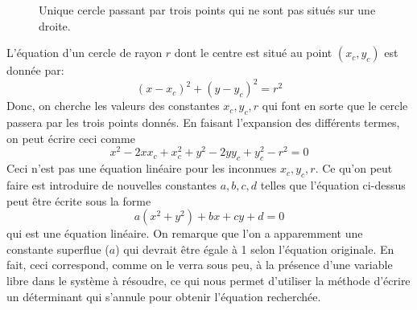 \begin{figure}[h]
\begin{center}
\caption{Unique cercle passant par trois points qui ne sont pas situés sur une droite.}
\end{center}
\end{figure}

L'équation d'un cercle de rayon $r$ dont le centre est situé au point $(x_c, y_c)$
est donnée par:
\[
(x-x_c)^2 + (y-y_c)^2 = r^2
\]
Donc, on cherche les valeurs des constantes $x_c, y_c, r$ qui font en sorte que
le cercle passera par les trois points donnés.
En faisant l'expansion des différents termes, on peut écrire ceci comme
\[
x^2 -2x x_c + x_c^2 + y^2 - 2y y_c + y_c^2 -r^2 = 0
\]
Ceci n'est pas une équation linéaire pour les inconnues $x_c, y_c, r$.  Ce qu'on
peut faire est introduire de nouvelles constantes $a,b,c,d$ telles que l'équation
ci-dessus peut être écrite sous la forme
\[
a(x^2+y^2) + bx + cy + d = 0
\]
qui est une équation linéaire.
On remarque que l'on a apparemment une constante superflue ($a$) qui devrait
être égale à 1 selon l'équation originale. En fait, ceci correspond, comme on
le verra sous peu, à la présence d'une variable libre dans le système à résoudre,
ce qui nous permet d'utiliser la méthode d'écrire un déterminant qui s'annule pour
obtenir l'équation recherchée.

